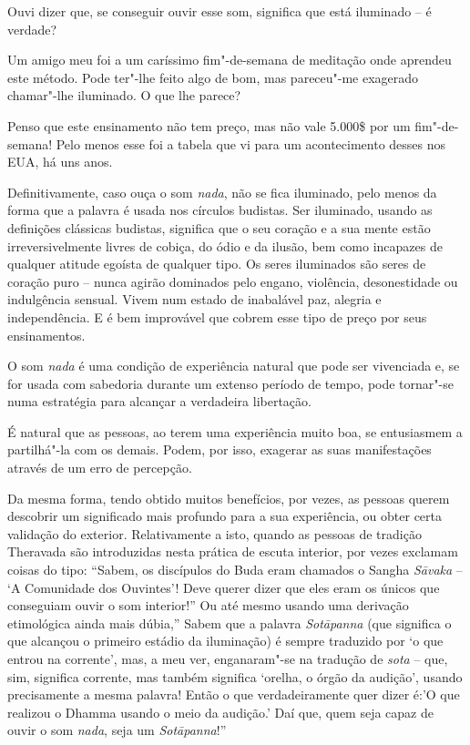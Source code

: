 \smallskip

 Ouvi dizer que, se conseguir ouvir esse som, significa que está
iluminado -- é verdade?

Um amigo meu foi a um caríssimo fim"-de-semana de meditação onde aprendeu
este método. Pode ter"-lhe feito algo de bom, mas pareceu"-me exagerado
chamar"-lhe iluminado. O que lhe parece?

 Penso que este ensinamento não tem preço, mas não vale 5.000\$ por um
fim"-de-semana! Pelo menos esse foi a tabela que vi para um acontecimento
desses nos EUA, há uns anos.

Definitivamente, caso ouça o som \emph{nada}, não se fica iluminado,
pelo menos da forma que a palavra é usada nos círculos budistas. Ser
iluminado, usando as definições clássicas budistas, significa que o seu
coração e a sua mente estão irreversivelmente livres de cobiça, do ódio
e da ilusão, bem como incapazes de qualquer atitude egoísta de qualquer
tipo. Os seres iluminados são seres de coração puro -- nunca agirão
dominados pelo engano, violência, desonestidade ou indulgência sensual.
Vivem num estado de inabalável paz, alegria e independência. E é bem
improvável que cobrem esse tipo de preço por seus ensinamentos.

O som \emph{nada} é uma condição de experiência natural que pode ser
vivenciada e, se for usada com sabedoria durante um extenso período de
tempo, pode tornar"-se numa estratégia para alcançar a verdadeira
libertação.

É natural que as pessoas, ao terem uma experiência muito boa, se
entusiasmem a partilhá"-la com os demais. Podem, por isso, exagerar as
suas manifestações através de um erro de percepção.

Da mesma forma, tendo obtido muitos benefícios, por vezes, as pessoas
querem descobrir um significado mais profundo para a sua experiência, ou
obter certa validação do exterior. Relativamente a isto, quando as
pessoas de tradição Theravada são introduzidas nesta prática de escuta
interior, por vezes exclamam coisas do tipo: ``Sabem, os discípulos do
Buda eram chamados o Sangha \emph{Sāvaka} -- `A Comunidade dos
Ouvintes'! Deve querer dizer que eles eram os únicos que conseguiam
ouvir o som interior!'' Ou até mesmo usando uma derivação etimológica
ainda mais dúbia,'' Sabem que a palavra \emph{Sotāpanna} (que significa
o que alcançou o primeiro estádio da iluminação) é sempre traduzido por
`o que entrou na corrente', mas, a meu ver, enganaram"-se na tradução de
\emph{sota} -- que, sim, significa corrente, mas também significa
`orelha, o órgão da audição', usando precisamente a mesma palavra! Então
o que verdadeiramente quer dizer é:'O que realizou o Dhamma usando o
meio da audição.' Daí que, quem seja capaz de ouvir o som \emph{nada},
seja um \emph{Sotāpanna}!''

